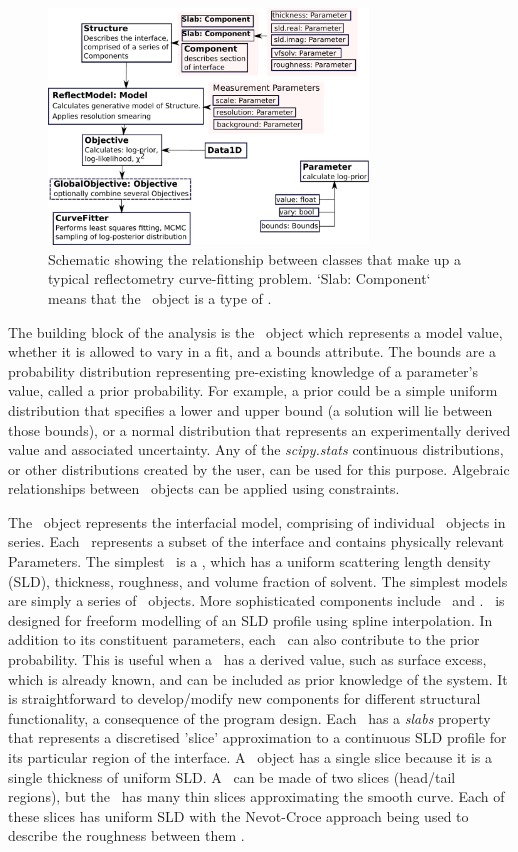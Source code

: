 \documentclass[pdf,preprint]{iucr}
\begin{document}
\begin{figure}
  \includegraphics[width=85mm]{components}
  \caption{Schematic showing the relationship between classes that make up a typical reflectometry curve-fitting problem. `Slab: Component` means that the \Slab\ object is a type of \Component.}
  \label{fig:components}
\end{figure}

The building block of the analysis is the \Parameter\ object which represents a model value, whether it is allowed to vary in a fit, and a bounds attribute. The bounds are a probability distribution representing pre-existing knowledge of a parameter's value, called a prior probability.
For example, a prior could be a simple uniform distribution that specifies a lower and upper bound (a solution will lie between those bounds), or a normal distribution that represents an experimentally derived value and associated uncertainty.
Any of the \emph{scipy.stats} \cite{Jones2001-2017} continuous distributions, or other distributions created by the user, can be used for this purpose. Algebraic relationships between \Parameter\ objects can be applied using constraints.

The \Structure\ object represents the interfacial model, comprising of individual \Component\ objects in series. Each \Component\ represents a subset of the interface and contains physically relevant Parameters. The simplest \Component\ is a \Slab, which has a uniform scattering length density (SLD), thickness, roughness, and volume fraction of solvent. The simplest models are simply a series of \Slab\ objects. More sophisticated components include \LipidLeaflet\ and \Spline. \Spline\ is designed for freeform modelling of an SLD profile using spline interpolation. In addition to its constituent parameters, each \Component\ can also contribute to the prior probability. This is useful when a \Component\ has a derived value, such as surface excess, which is already known, and can be included as prior knowledge of the system. 
It is straightforward to develop/modify new components for different structural functionality, a consequence of the program design.
Each \Component\ has a \emph{slabs} property that represents a discretised 'slice' approximation to a continuous SLD profile for its particular region of the interface. A \Slab\ object has a single slice because it is a single thickness of uniform SLD. A \LipidLeaflet\ can be made of two slices (head/tail regions), but the \Spline\ has many thin slices approximating the smooth curve. Each of these slices has uniform SLD with the Nevot-Croce approach being used to describe the roughness between them \cite{Nevot1980}.
\end{document}
